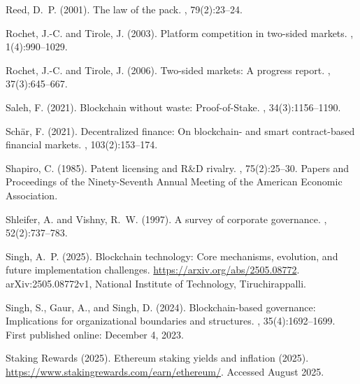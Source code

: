 \documentclass[12pt]{article}
\begin{document}
\begin{thebibliography}{}
Reed, D.~P. (2001).
\newblock The law of the pack.
, 79(2):23--24.

Rochet, J.-C. and Tirole, J. (2003).
\newblock Platform competition in two-sided markets.
, 1(4):990--1029.

Rochet, J.-C. and Tirole, J. (2006).
\newblock Two-sided markets: A progress report.
, 37(3):645--667.

Saleh, F. (2021).
\newblock Blockchain without waste: Proof-of-Stake.
, 34(3):1156--1190.

Schär, F. (2021).
\newblock Decentralized finance: On blockchain- and smart contract-based
  financial markets.
, 103(2):153--174.

Shapiro, C. (1985).
\newblock Patent licensing and R\&D rivalry.
, 75(2):25--30.
\newblock Papers and Proceedings of the Ninety-Seventh Annual Meeting of the
  American Economic Association.

Shleifer, A. and Vishny, R.~W. (1997).
\newblock A survey of corporate governance.
, 52(2):737--783.

Singh, A.~P. (2025).
\newblock Blockchain technology: Core mechanisms, evolution, and future
  implementation challenges.
\newblock \url{https://arxiv.org/abs/2505.08772}.
\newblock arXiv:2505.08772v1, National Institute of Technology,
  Tiruchirappalli.

Singh, S., Gaur, A., and Singh, D. (2024).
\newblock Blockchain-based governance: Implications for organizational
  boundaries and structures.
, 35(4):1692--1699.
\newblock First published online: December 4, 2023.

{Staking Rewards} (2025).
\newblock Ethereum staking yields and inflation (2025).
\newblock \url{https://www.stakingrewards.com/earn/ethereum/}.
\newblock Accessed August 2025.


\end{thebibliography}
\end{document}
